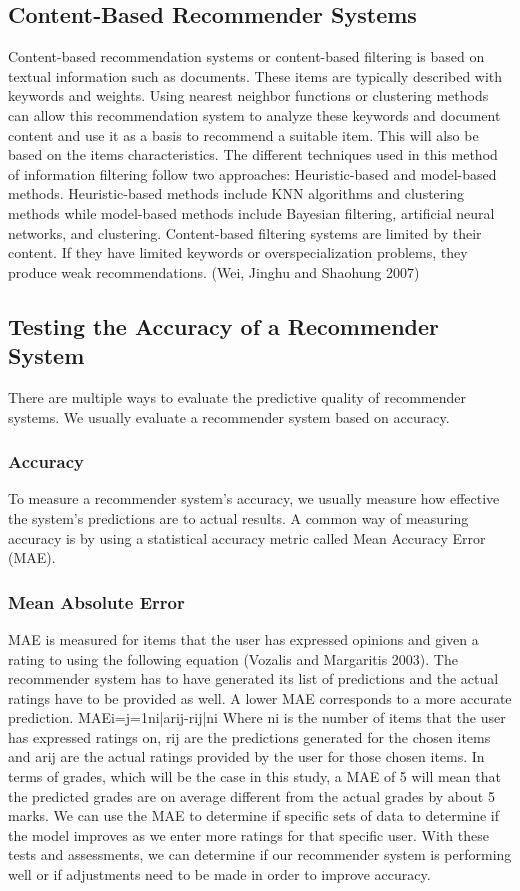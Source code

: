 \subsection{Content‐Based Recommender Systems}
Content-based recommendation systems or content-based filtering is based on textual information such as documents. These items are typically described with keywords and weights. Using nearest neighbor functions or clustering methods can allow this recommendation system to analyze these keywords and document content and use it as a basis to recommend a suitable item. This will also be based on the items characteristics. The different techniques used in this method of information filtering follow two approaches: Heuristic-based and model-based methods. Heuristic-based methods include KNN algorithms and clustering methods while model-based methods include Bayesian filtering, artificial neural networks, and clustering. Content-based filtering systems are limited by their content. If they have limited keywords or overspecialization problems, they produce weak recommendations. (Wei, Jinghu and Shaohung 2007)
\subsection{Testing the Accuracy of a Recommender System}
There are multiple ways to evaluate the predictive quality of recommender systems. We usually evaluate a recommender system based on accuracy.
\subsubsection{Accuracy}
To measure a recommender system’s accuracy, we usually measure how effective the system’s predictions are to actual results. A common way of measuring accuracy is by using a statistical accuracy metric called Mean Accuracy Error (MAE).
\subsubsection{Mean Absolute Error}
MAE is measured for items that the user has expressed opinions and given a rating to using the following equation (Vozalis and Margaritis 2003). The recommender system has to have generated its list of predictions and the actual ratings have to be provided as well. A lower MAE corresponds to a more accurate prediction.
MAEi=j=1ni|arij-rij|ni
Where ni is the number of items that the user has expressed ratings on, rij are the predictions generated for the chosen items and arij are the actual ratings provided by the user for those chosen items.
In terms of grades, which will be the case in this study, a MAE of 5 will mean that the predicted grades are on average different from the actual grades by about 5 marks.
We can use the MAE to determine if specific sets of data to determine if the model improves as we enter more ratings for that specific user. With these tests and assessments, we can determine if our recommender system is performing well or if adjustments need to be made in order to improve accuracy.

